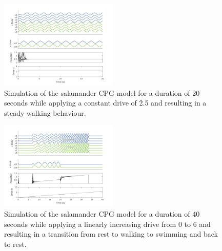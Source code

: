 \documentclass[a4paper]{scrartcl}
\begin{document}
\begin{figure}[!h]
	\includegraphics[width=0.5\textwidth]{fig/figure7a-walk.png}
	\caption{Simulation of the salamander CPG model for a duration of 20 seconds while applying a constant drive of 2.5 and resulting in a steady walking behaviour.}
	\label{fig:7a-walk}
\end{figure}

\begin{figure}[!h]
	\includegraphics[width=0.5\textwidth]{fig/figure7a-drivegradient.png}
	\caption{Simulation of the salamander CPG model for a duration of 40 seconds while applying a linearly increasing drive from 0 to 6 and resulting in a transition from rest to walking to swimming and back to rest.}
	\label{fig:7a-transition}
\end{figure}
\end{document}
